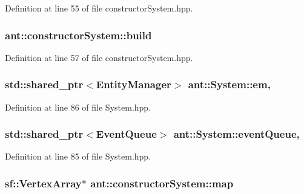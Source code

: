 Definition at line 55 of file constructor\+System.\+hpp.

\hypertarget{classant_1_1constructor_system_a74af4d407eef12c65078236b9e230842}{
\subsubsection[{build}]{ ant\+::constructor\+System\+::build\hspace{0.3cm}{\ttfamily [private]}}}\label{classant_1_1constructor_system_a74af4d407eef12c65078236b9e230842}


Definition at line 57 of file constructor\+System.\+hpp.

\hypertarget{classant_1_1_system_a5661d872ff769be150bd4e9a9552f6b9}{
\subsubsection[{em}]{\setlength{\rightskip}{0pt plus 5cm}std\+::shared\+\_\+ptr$<${\bf Entity\+Manager}$>$ ant\+::\+System\+::em\hspace{0.3cm}{\ttfamily [protected]}, {\ttfamily [inherited]}}}\label{classant_1_1_system_a5661d872ff769be150bd4e9a9552f6b9}


Definition at line 86 of file System.\+hpp.

\hypertarget{classant_1_1_system_a27e1814e13d161b5ef0e848e3da16d29}{
\subsubsection[{event\+Queue}]{\setlength{\rightskip}{0pt plus 5cm}std\+::shared\+\_\+ptr$<${\bf Event\+Queue}$>$ ant\+::\+System\+::event\+Queue\hspace{0.3cm}{\ttfamily [protected]}, {\ttfamily [inherited]}}}\label{classant_1_1_system_a27e1814e13d161b5ef0e848e3da16d29}


Definition at line 85 of file System.\+hpp.

\hypertarget{classant_1_1constructor_system_a4d5ae03552b88bbfdcda91608b19e036}{
\subsubsection[{map}]{\setlength{\rightskip}{0pt plus 5cm}sf\+::\+Vertex\+Array$\ast$ ant\+::constructor\+System\+::map\hspace{0.3cm}{\ttfamily [private]}}}\label{classant_1_1constructor_system_a4d5ae03552b88bbfdcda91608b19e036}



